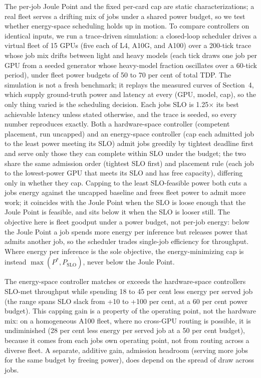 \documentclass[3p,twocolumn]{elsarticle}
\begin{document}
The per-job Joule Point and the fixed per-card cap are static characterizations; a real fleet serves a
drifting mix of jobs under a shared power budget, so we test whether energy-space scheduling holds up in motion.
To compare controllers on identical inputs, we run a trace-driven simulation: a closed-loop scheduler drives a
virtual fleet of 15 GPUs (five each of L4, A10G, and A100) over a 200-tick trace whose job mix drifts between
light and heavy models (each tick draws one job per GPU from a seeded generator whose heavy-model fraction oscillates over a 60-tick period), under fleet power budgets of 50 to 70 per cent of total TDP. The simulation is not a
fresh benchmark; it replays the measured curves of Section~4, which supply ground-truth power and latency at
every (GPU, model, cap), so the only thing varied is the scheduling decision. Each job\textquotesingle s SLO is 1.25$\times$ its
best achievable latency unless stated otherwise, and the trace is seeded, so every number reproduces exactly.
Both a hardware-space controller (competent placement, run uncapped) and an energy-space controller (cap each
admitted job to the least power meeting its SLO) admit jobs greedily by tightest deadline first and serve only
those they can complete within SLO under the budget; the two share the same admission order (tightest SLO first) and placement rule (each job to the lowest-power GPU that meets its SLO and has free capacity),
differing only in whether they cap. Capping to the least SLO-feasible power both cuts a job\textquotesingle s energy against the
uncapped baseline and frees fleet power to admit more work; it coincides with the Joule Point when the SLO is
loose enough that the Joule Point is feasible, and sits below it when the SLO is looser still. The objective here
is fleet goodput under a power budget, not per-job energy: below the Joule Point a job spends more energy per
inference but releases power that admits another job, so the scheduler trades single-job efficiency for
throughput. Where energy per inference is the sole objective, the energy-minimizing cap is instead
{\(\max(P^{*},P_{\mathrm{SLO}})\)}, never below the Joule Point.

The energy-space controller matches or exceeds the hardware-space controller\textquotesingle s SLO-met throughput while
spending 18 to 45 per cent less energy per served job (the range spans SLO slack from +10 to
+100 per cent, at a 60 per cent power budget). This capping gain is a property of the operating point, not the
hardware mix: on a homogeneous A100 fleet, where no cross-GPU routing is possible, it is undiminished
(28 per cent less energy per served job at a 50 per cent budget), because it
comes from each job\textquotesingle s own operating point, not from routing across a diverse fleet. A separate, additive gain,
admission headroom (serving more jobs for the same budget by freeing power), does depend on the spread of draw
across jobs.
\end{document}
